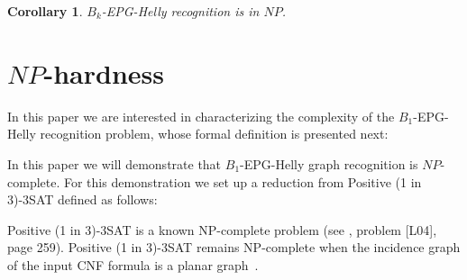 \documentclass[a4paper,11pt]{article}
\newtheorem{coro}[theorem]{Corollary}
\begin{document}
\begin{coro}
{\sc $B_k$-EPG-Helly  recognition} is in $NP$.
\end{coro}
 



\section{$NP$-hardness}\label{sec:sectionDispositivoClausula}

In this paper we are interested in characterizing the complexity of the $B_1$-EPG-Helly recognition problem, whose formal definition is presented next:



In this paper we will demonstrate that  $B_1$-EPG-Helly graph recognition is $NP$-complete. For this demonstration we set up a reduction from {\sc Positive (1 in 3)-3SAT} defined  as follows:






{\sc Positive (1 in 3)-3SAT } is a known NP-complete problem (see \citep{johnson1979}, problem [L04], page 259). {\sc Positive (1 in 3)-3SAT} remains NP-complete when the incidence graph of the input CNF formula is a planar graph~\citep{mulzer2008minimum}.
\end{document}
